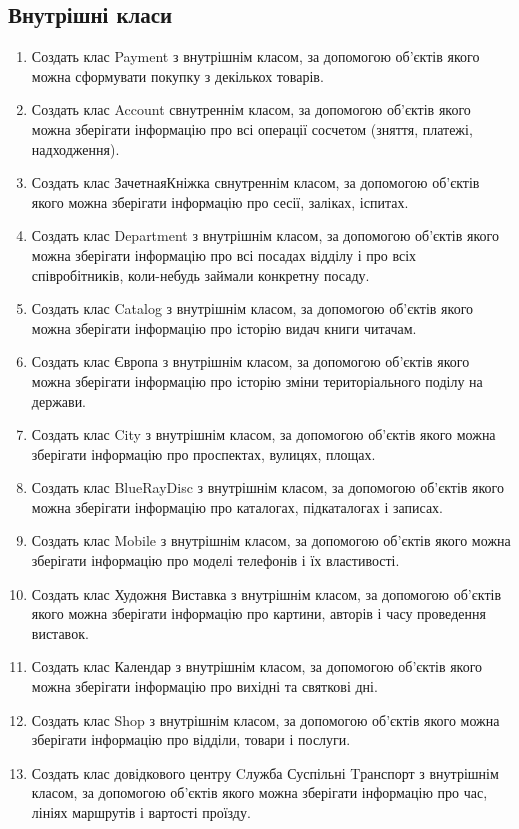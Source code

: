 \documentclass[]{article}
\begin{document}
\subsection{Внутрішні класи}
\begin{enumerate}
\def\labelenumi{8.\arabic{enumi}.}

\item  Создать клас Payment з внутрішнім класом, за допомогою об'єктів якого можна сформувати покупку з декількох товарів.
\item  Создать клас Account свнутреннім класом, за допомогою об'єктів якого можна зберігати інформацію про всі операції сосчетом (зняття, платежі, надходження).
\item  Создать клас ЗачетнаяКніжка свнутреннім класом, за допомогою об'єктів якого можна зберігати інформацію про сесії, заліках, іспитах.
\item  Создать клас Department з внутрішнім класом, за допомогою об'єктів якого можна зберігати інформацію про всі посадах відділу і про всіх співробітників, коли-небудь займали конкретну посаду.
\item  Создать клас Catalog з внутрішнім класом, за допомогою об'єктів якого можна зберігати інформацію про історію видач книги читачам.
\item  Создать клас Європа з внутрішнім класом, за допомогою об'єктів якого можна зберігати інформацію про історію зміни територіального поділу на держави.
\item  Создать клас City з внутрішнім класом, за допомогою об'єктів якого можна зберігати інформацію про проспектах, вулицях, площах.
\item  Создать клас BlueRayDisc з внутрішнім класом, за допомогою об'єктів якого можна зберігати інформацію про каталогах, підкаталогах і записах.
\item  Создать клас Mobile з внутрішнім класом, за допомогою об'єктів якого можна зберігати інформацію про моделі телефонів і їх властивості.
\item  Создать клас Художня Виставка з внутрішнім класом, за допомогою об'єктів якого можна зберігати інформацію про картини, авторів і часу проведення виставок.
\item  Создать клас Календар з внутрішнім класом, за допомогою об'єктів якого можна зберігати інформацію про вихідні та святкові дні.
\item  Создать клас Shop з внутрішнім класом, за допомогою об'єктів якого можна зберігати інформацію про відділи, товари і послуги.
\item  Создать клас довідкового центру Cлужба Суспільні Tранспорт з внутрішнім класом, за допомогою об'єктів якого можна зберігати інформацію про час, лініях маршрутів і вартості проїзду.

\end{enumerate}
\end{document}
